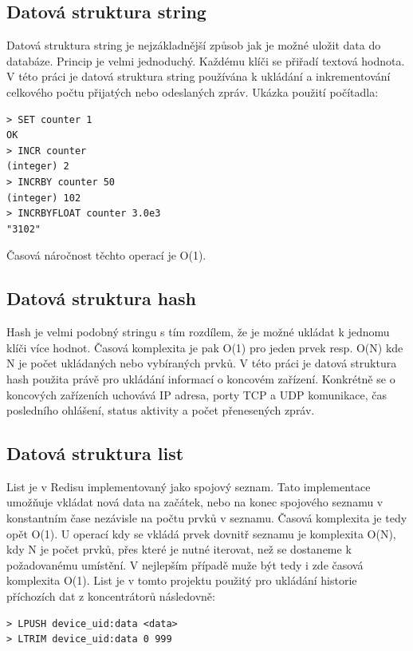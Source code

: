 \subsection{Datová struktura string}
Datová struktura string je nejzákladnější způsob jak je možné uložit data do databáze. Princip je velmi jednoduchý. Každému klíči se přiřadí textová hodnota. V této práci je datová struktura string používána k ukládání a inkrementování celkového počtu přijatých nebo odeslaných zpráv. Ukázka použití počítadla:

\begin{verbatim}
> SET counter 1
OK
> INCR counter
(integer) 2
> INCRBY counter 50
(integer) 102
> INCRBYFLOAT counter 3.0e3
"3102"
\end{verbatim}

Časová náročnost těchto operací je O(1).

\subsection{Datová struktura hash}
Hash je velmi podobný stringu s tím rozdílem, že je možné ukládat k jednomu klíči více hodnot. Časová komplexita je pak O(1) pro jeden prvek resp. O(N) kde N je počet ukládaných nebo vybíraných prvků. V této práci je datová struktura hash použita právě pro ukládání informací o koncovém zařízení. Konkrétně se o koncových zařízeních uchovává IP adresa, porty TCP a UDP komunikace, čas posledního ohlášení, status aktivity a počet přenesených zpráv.

\subsection{Datová struktura list}
List je v Redisu implementovaný jako spojový seznam. Tato implementace umožňuje vkládat nová data na začátek, nebo na konec spojového seznamu v konstantním čase nezávisle na počtu prvků v seznamu. Časová komplexita je tedy opět O(1). U operací kdy se vkládá prvek dovnitř seznamu je komplexita O(N), kdy N je počet prvků, přes které je nutné iterovat, než se dostaneme k požadovanému umístění. V nejlepším případě muže být tedy i zde časová komplexita O(1). List je v tomto projektu použitý pro ukládání historie příchozích dat z koncentrátorů následovně:

\begin{verbatim}
> LPUSH device_uid:data <data>
> LTRIM device_uid:data 0 999
\end{verbatim}

